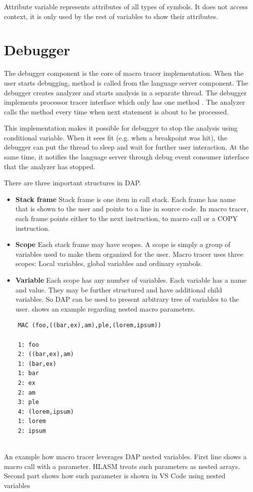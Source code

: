 Attribute variable represents attributes of all types of symbols. It does not access context, it is only used by the rest of variables to show their attributes.

\section{Debugger}


The debugger component is the core of macro tracer implementation. When the user starts debugging, method  is called from the language server component. The debugger creates analyzer and starts analysis in a separate thread. The debugger implements processor tracer interface which only has one method . The analyzer calls the  method every time when next statement is about to be processed.

This implementation makes it possible for debugger to stop the analysis using conditional variable. When it sees fit (e.g. when a breakpoint was hit), the debugger can put the thread to sleep and wait for further user interaction. At the same time, it notifies the language server through debug event consumer interface that the analyzer has stopped.

There are three important structures in DAP.
\begin{itemize}
	\item \textbf{Stack frame} Stack frame is one item in call stack. Each frame has name that is shown to the user and points to a line in source code. In macro tracer, each frame points either to the next instruction, to macro call or a COPY instruction.
	\item \textbf{Scope} Each stack frame may have scopes. A scope is simply a group of variables used to make them organized for the user. Macro tracer uses three scopes: Local variables, global variables and ordinary symbols.
	\item \textbf{Variable} Each scope has any number of variables. Each variable has a name and value. They may be further structured and have additional child variables. So DAP can be used to present arbitrary tree of variables to the user.  shows an example regarding nested macro parameters.

\end{itemize}

\begin{listing}
	
	\begin{verbatim}
	MAC (foo,((bar,ex),am),ple,(lorem,ipsum))
	
	1: foo
	2: ((bar,ex),am)
	1: (bar,ex)
	1: bar
	2: ex
	2: am
	3: ple
	4: (lorem,ipsum)
	1: lorem
	2: ipsum
	
	\end{verbatim}
	\caption{An example how macro tracer leverages DAP nested variables. First line shows a macro call with a parameter. HLASM treats such parameters as nested arrays. Second part shows how such parameter is shown in VS Code using nested variables}
	\label{dap_nested_variables}
\end{listing}


